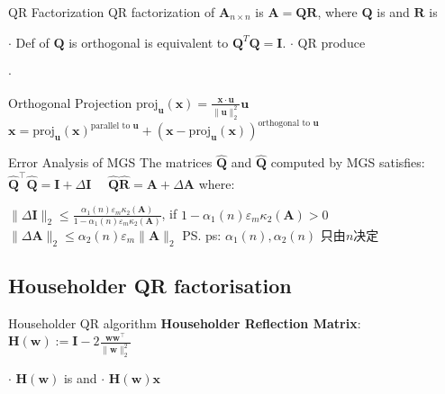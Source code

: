 \documentclass{note}
\begin{document}
\begin{MyTh}{QR Factorization}
  QR factorization of $\mathbf{A}_{n\times n}$ is $\mathbf{A} = \mathbf{Q}\mathbf{R}$, where $\mathbf{Q}$ is  and $\mathbf{R}$ is 

  \quad $\cdot$ Def of $\mathbf{Q}$ is orthogonal is equivalent to $\mathbf{Q}^T\mathbf{Q}=\mathbf{I}$. 
  \quad $\cdot$ QR produce 

  \quad $\cdot$ \begin{MyTh}{Orthogonal Projection}
    $\text{proj}_{\mathbf{u}}(\mathbf{x}) = \frac{\mathbf{x} \cdot \mathbf{u}}{\|\mathbf{u}\|^2_2} \mathbf{u}$ \  \hspace{2cm} $\mathbf{x}=\text{proj}_{\mathbf{u}}(\mathbf{x})^{\text{parallel to }\mathbf{u}} + (\mathbf{x} - \text{proj}_{\mathbf{u}}(\mathbf{x}))^{\text{orthogonal to }\mathbf{u}}$
  \end{MyTh}

\end{MyTh}

\begin{MyTh}{Error Analysis of MGS}
  The matrices $\widehat{\mathbf{Q}}$ and $\widehat{\mathbf{Q}}$ computed by MGS satisfies: \quad $\widehat{\mathbf{Q}}^\top\widehat{\mathbf{Q}}=\mathbf{I}+\Delta\mathbf{I}$ \ \ $\widehat{\mathbf{Q}}\widehat{\mathbf{R}}=\mathbf{A}+\Delta\mathbf{A}$ where:

  \hspace{3.0cm} $\| \Delta\mathbf{I}\|_2 \leq \frac{\alpha_1(n) \varepsilon_m\kappa_2(\mathbf{A})}{1-\alpha_1(n)\varepsilon_m\kappa_2(\mathbf{A})}$, if $1-\alpha_1(n)\varepsilon_m\kappa_2(\mathbf{A})>0$ \qquad $\|\Delta\mathbf{A}\|_2\leq\alpha_2(n)\varepsilon_m\|\mathbf{A}\|_2$ \ps{ps: $\alpha_1(n),\alpha_2(n)$ 只由$n$决定}
\end{MyTh}


\subsection{Householder QR factorisation}

\begin{MyTh}{Householder QR}
    algorithm \qquad \textbf{Householder Reflection Matrix}: $\mathbf{H}(\mathbf{w}):=\mathbf{I}-2\frac{\mathbf{w}\mathbf{w}^\top}{\|\mathbf{w}\|_2^2}$ \quad {}

  \vspace{-2pt}
  \quad $\cdot$ $\mathbf{H}(\mathbf{w})$ is  and   \qquad $\cdot$ $\mathbf{H}(\mathbf{w})\mathbf{x}$ 
\end{MyTh}
\end{document}
